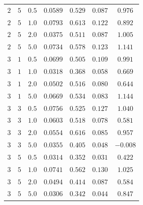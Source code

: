 \begin{table}[!htb]
\begin{tabular}{ccccccc}
$2$ & $5$ & $0.5$ & $0.0589$ & $0.529$ & $0.087$ & $0.976$ \\
$2$ & $5$ & $1.0$ & $0.0793$ & $0.613$ & $0.122$ & $0.892$ \\
$2$ & $5$ & $2.0$ & $0.0375$ & $0.511$ & $0.087$ & $1.005$ \\
$2$ & $5$ & $5.0$ & $0.0734$ & $0.578$ & $0.123$ & $1.141$ \\
\midrule
$3$ & $1$ & $0.5$ & $0.0699$ & $0.505$ & $0.109$ & $0.991$ \\
$3$ & $1$ & $1.0$ & $0.0318$ & $0.368$ & $0.058$ & $0.669$ \\
$3$ & $1$ & $2.0$ & $0.0502$ & $0.516$ & $0.080$ & $0.644$ \\
$3$ & $1$ & $5.0$ & $0.0669$ & $0.534$ & $0.083$ & $1.144$ \\
$3$ & $3$ & $0.5$ & $0.0756$ & $0.525$ & $0.127$ & $1.040$ \\
$3$ & $3$ & $1.0$ & $0.0603$ & $0.518$ & $0.078$ & $0.581$ \\
$3$ & $3$ & $2.0$ & $0.0554$ & $0.616$ & $0.085$ & $0.957$ \\
$3$ & $3$ & $5.0$ & $0.0355$ & $0.405$ & $0.048$ & $-0.008$ \\
$3$ & $5$ & $0.5$ & $0.0314$ & $0.352$ & $0.031$ & $0.422$ \\
$3$ & $5$ & $1.0$ & $0.0741$ & $0.562$ & $0.130$ & $1.025$ \\
$3$ & $5$ & $2.0$ & $0.0494$ & $0.414$ & $0.087$ & $0.584$ \\
$3$ & $5$ & $5.0$ & $0.0306$ & $0.342$ & $0.044$ & $0.847$ \\
\bottomrule
\end{tabular}
\end{table}
